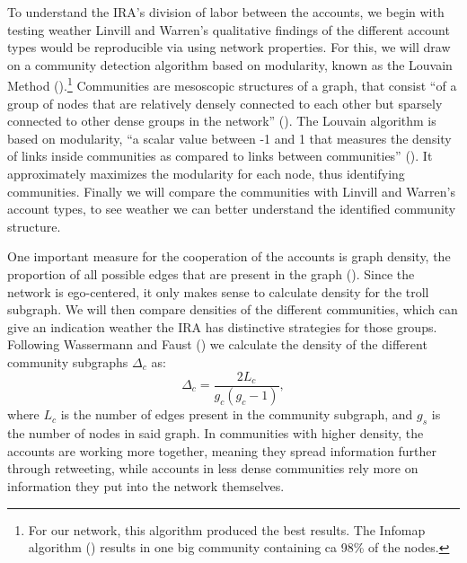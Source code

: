 \documentclass[12pt, titlepage=true, toc=bib]{scrartcl}
\begin{document}
To understand the IRA's division of labor between the accounts, we begin with testing weather Linvill and Warren's qualitative findings of the different account types would be reproducible via using network properties. For this, we will draw on a community detection algorithm based on modularity, known as the Louvain Method (\cite{blondel_fast_2008}).\footnote{For our network, this algorithm produced the best results. The Infomap algorithm (\cite[cf.][]{rosvall_maps_2008}) results in one big community containing ca 98\% of the nodes.} Communities are mesoscopic structures of a graph, that consist ``of a group of nodes that are relatively densely connected to each other but sparsely connected to other dense groups in the network'' (\cite[1083]{porter_communities_2009}). The Louvain algorithm is based on modularity, ``a scalar value between -1 and 1 that measures the density of links inside communities as compared to links between communities'' (\cites[2]{blondel_fast_2008}[cf. also][1089]{porter_communities_2009}). It approximately maximizes the modularity for each node, thus identifying communities. Finally we will compare the communities with Linvill and Warren's account types, to see weather we can better understand the identified community structure.

One important measure for the cooperation of the accounts is graph density, the proportion of all possible edges that are present in the graph (\cite[101]{wasserman_social_1994}). Since the network is ego-centered, it only makes sense to calculate density for the troll subgraph. We will then compare densities of the different communities, which can give an indication weather the IRA has distinctive strategies for those groups. Following Wassermann and Faust (\cite*[102]{wasserman_social_1994}) we calculate the density of the different community subgraphs \( \Delta_{c} \) as: \[ \Delta_{c} = \frac{2L_{c}}{g_{c}(g_{c} - 1)} ,\] where \( L_{c} \) is the number of edges present in the community subgraph, and \( g_{s} \) is the number of nodes in said graph. In communities with higher density, the accounts are working more together, meaning they spread information further through retweeting, while accounts in less dense communities rely more on information they put into the network themselves.
\end{document}
